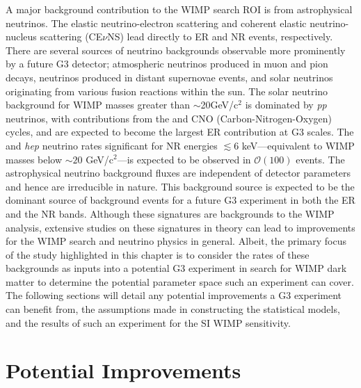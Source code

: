 A major background contribution to the WIMP search ROI is from astrophysical neutrinos. The elastic neutrino-electron scattering \cite{HASERT1973138} and coherent elastic neutrino-nucleus scattering (CE$\nu$NS) \cite{Akimov_2017} lead directly to ER and NR events, respectively. There are several sources of neutrino backgrounds observable more prominently by a future G3 detector; atmospheric neutrinos produced in muon and pion decays, neutrinos produced in distant supernovae events, and solar neutrinos originating from various fusion reactions within the sun. The solar neutrino background for WIMP masses greater than $\sim$20GeV/c$^{2}$ is dominated by \textit{pp} neutrinos, with contributions from the \BeS{} and CNO (Carbon-Nitrogen-Oxygen) cycles, and are expected to become the largest ER contribution at G3 scales. The \BE{} and \textit{hep} neutrino rates significant for NR energies $\lesssim 6$ keV---equivalent to WIMP masses below $\sim20$ GeV/c$^{2}$---is expected to be observed in $\mathcal{O}(100)$ events. The astrophysical neutrino background fluxes are independent of detector parameters and hence are irreducible in nature. This background source is expected to be the dominant source of background events for a future G3 experiment in both the ER and the NR bands. Although these signatures are backgrounds to the WIMP analysis, extensive studies on these signatures in theory can lead to improvements for the WIMP search and neutrino physics in general. Albeit, the primary focus of the study highlighted in this chapter is to consider the rates of these backgrounds as inputs into a potential G3 experiment in search for WIMP dark matter to determine the potential parameter space such an experiment can cover. The following sections will detail any potential improvements a G3 experiment can benefit from, the assumptions made in constructing the statistical models, and the results of such an experiment for the SI WIMP sensitivity. 


\section{Potential Improvements}
\label{sec:g3_improvements}

